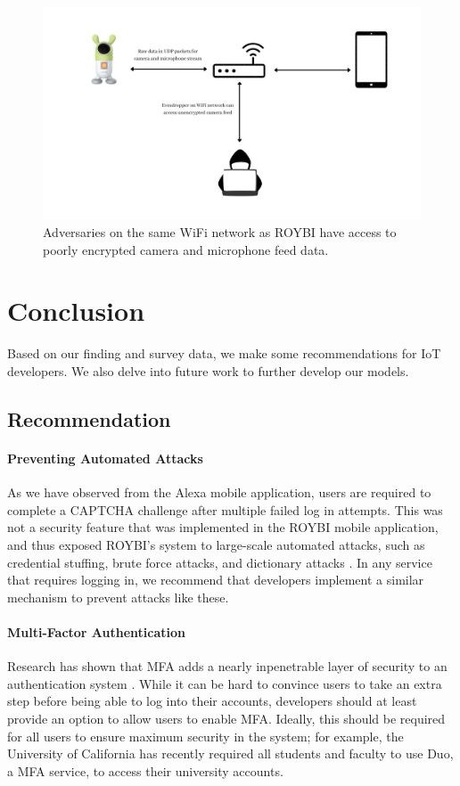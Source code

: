 \documentclass[12pt]{ucthesis}
\begin{document}
\begin{figure}
    \includegraphics[width=\textwidth]{evesdropper.jpg}
    \caption{Adversaries on the same WiFi network as ROYBI have access to poorly encrypted camera and microphone feed data.}
    \label{fig:evesdropper}
\end{figure}

\chapter{Conclusion}
\label{ch:conclusion}
Based on our finding and survey data, we make some recommendations for IoT developers. We also delve into future work to further develop our models.
\section{Recommendation}
\subsubsection{Preventing Automated Attacks}
As we have observed from the Alexa mobile application, users are required to complete a CAPTCHA challenge after multiple failed log in attempts. This was not a security feature that was implemented in the ROYBI mobile application, and thus exposed ROYBI's system to large-scale automated attacks, such as credential stuffing, brute force attacks, and dictionary attacks \cite{brute}. In any service that requires logging in, we recommend that developers implement a similar mechanism to prevent attacks like these.

\subsubsection{Multi-Factor Authentication}
Research has shown that MFA adds a nearly inpenetrable layer of security to an authentication system \cite{mfa}. While it can be hard to convince users to take an extra step before being able to log into their accounts, developers should at least provide an option to allow users to enable MFA. Ideally, this should be required for all users to ensure maximum security in the system; for example, the University of California has recently required all students and faculty to use Duo, a MFA service, to access their university accounts. 
\end{document}
